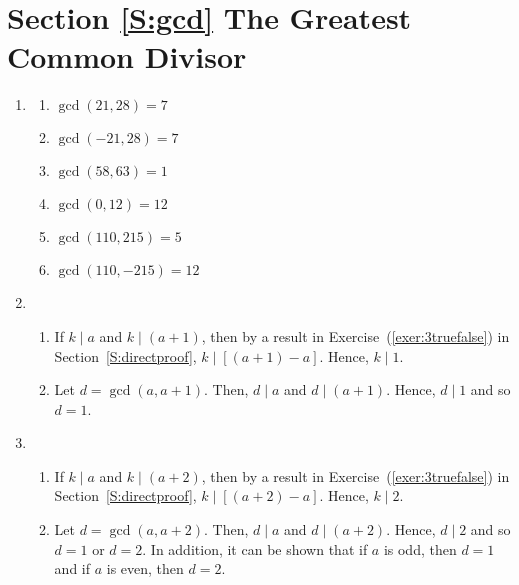 \section*{Section \ref{S:gcd} The Greatest Common Divisor}

\begin{enumerate}
\item \begin{multicols}{2}
\begin{enumerate}
\item $\gcd \left( {21, 28} \right) = 7$

\item $\gcd \left( { - 21, 28} \right) = 7$

\item $\gcd \left( {58, 63} \right) = 1$

\item $\gcd \left( {0, 12} \right) = 12$

\item $\gcd \left( {110, 215} \right) = 5$

\item $\gcd \left( {110, -215} \right) = 12$
\end{enumerate}
\end{multicols}



\item \begin{enumerate}
\item If $k \mid a$ and $k \mid \left( a + 1 \right)$, then by a result in 
Exercise~(\ref{exer:3truefalse}) in Section~\ref{S:directproof}, 
$k \mid \left[ \left( a + 1 \right) - a \right]$.  Hence, $k \mid 1$.

\item Let $d = \gcd \left( a, a + 1 \right)$.  Then, $d \mid a$ and 
$d \mid \left( a + 1 \right)$.  Hence, $d \mid 1$ and so $d = 1$.
\end{enumerate}



\item \begin{enumerate}
\item If $k \mid a$ and $k \mid \left( a + 2 \right)$, then by a result in 
Exercise~(\ref{exer:3truefalse}) in Section~\ref{S:directproof}, 
$k \mid \left[ \left( a + 2 \right) - a \right]$.  Hence, $k \mid 2$.

\item Let $d = \gcd \left( a, a + 2 \right)$.  Then, $d \mid a$ and $d \mid \left( a + 2 \right)$.  Hence, $d \mid 2$ and so $d = 1$ or $d = 2$.  In addition, it can be shown that if $a$ is odd, then $d = 1$ and if $a$ is even, then $d = 2$.
\end{enumerate}



\end{enumerate}
